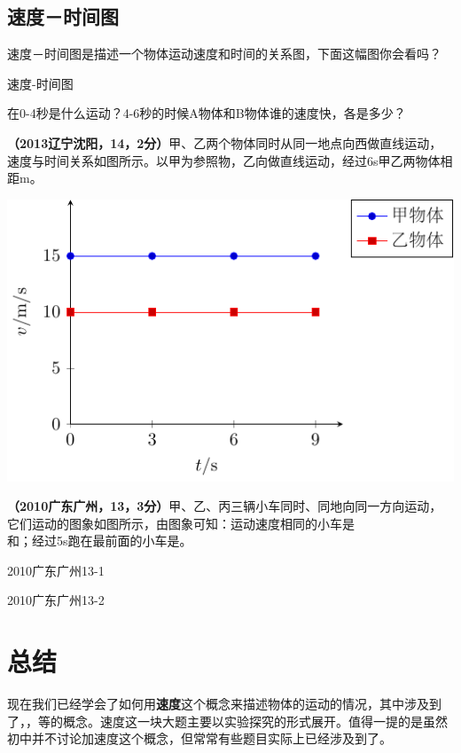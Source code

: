 \documentclass[12pt]{exam}%
\begin{document}
\begin{knowledge}
\subsection{速度－时间图}
速度－时间图是描述一个物体运动速度和时间的关系图，下面这幅图你会看吗？
\begin{fig}{速度-时间图}
\end{fig}

在0-4秒是什么运动？4-6秒的时候A物体和B物体谁的速度快，各是多少？


\textbf{（2013辽宁沈阳，14，2分）}甲、乙两个物体同时从同一地点向西做直线运动，速度与时间关系如图所示。以甲为参照物，乙向\answerline*[东]做直线运动，经过6s甲乙两物体相距\answerline*[30]m。

\hfill
\includegraphics[scale=1]{figures/2013辽宁沈阳14.pdf} 


\textbf{（2010广东广州，13，3分）}甲、乙、丙三辆小车同时、同地向同一方向运动，它们运动的图象如图所示，由图象可知：运动速度相同的小车是\answerline*[甲]\\和\answerline*[丙]；经过5s跑在最前面的小车是\answerline*[乙]。
\begin{multicols}{2}
\begin{linefig}{2010广东广州13-1}
\end{linefig}
\columnbreak
\begin{linefig}{2010广东广州13-2}
\end{linefig}
\end{multicols}


\section{总结}
现在我们已经学会了如何用\textbf{速度}这个概念来描述物体的运动的情况，其中涉及到了，，等的概念。速度这一块大题主要以实验探究的形式展开。值得一提的是虽然初中并不讨论加速度这个概念，但常常有些题目实际上已经涉及到了。


\end{knowledge}
\end{document}
